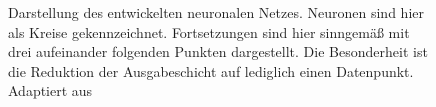 \begin{figure}[H]
\begin{tikzpicture}[x=1.5cm, y=1.5cm, >=stealth]
				\end{tikzpicture}
		
		\caption{Darstellung des entwickelten neuronalen Netzes. Neuronen sind hier als Kreise gekennzeichnet. Fortsetzungen sind hier sinngemäß mit drei aufeinander folgenden Punkten dargestellt. Die Besonderheit ist die Reduktion der Ausgabeschicht auf lediglich einen Datenpunkt. Adaptiert aus \cite{neuron}}
		\label{fig: ownnet}
		\end{figure}